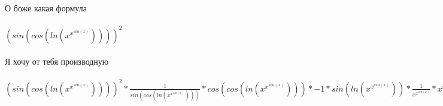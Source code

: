 \documentclass[a4paper, 12pt, oneside]{scrartcl}
\begin{document}
О боже какая формула \\ \\ 
$(sin(cos(ln(x^{x^{sin(x)}}))))^{2}$ \\ \\ 
Я хочу от тебя производную \\ \\ 
$(sin(cos(ln(x^{x^{sin(x)}}))))^{2}*\frac{1}{sin(cos(ln(x^{x^{sin(x)}})))}*cos(cos(ln(x^{x^{sin(x)}})))*-1*sin(ln(x^{x^{sin(x)}}))*\frac{1}{x^{x^{sin(x)}}}*x^{x^{sin(x)}}*(x^{sin(x)}*(cos(x)*ln(x)+x^{-1}*sin(x))*ln(x)+x^{-1}*x^{sin(x)})*2$ \\ \\ 
\end{document}
